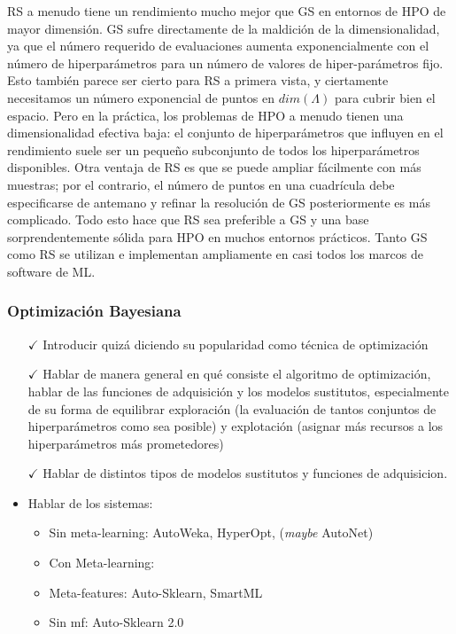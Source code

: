 RS a menudo tiene un rendimiento mucho mejor que GS en entornos de HPO de mayor dimensión. GS sufre directamente de la maldición de la dimensionalidad, ya que el número requerido de evaluaciones aumenta exponencialmente con el número de hiperparámetros para un número de valores de hiper-parámetros fijo. Esto también parece ser cierto para RS a primera vista, y ciertamente necesitamos un número exponencial de puntos en $dim(\varLambda)$ para cubrir bien el espacio. Pero en la práctica, los problemas de HPO a menudo tienen una dimensionalidad efectiva baja: el conjunto de hiperparámetros que influyen en el rendimiento suele ser un pequeño subconjunto de todos los hiperparámetros disponibles. Otra ventaja de RS es que se puede ampliar fácilmente con más muestras; por el contrario, el número de puntos en una cuadrícula debe especificarse de antemano y refinar la resolución de GS posteriormente es más complicado. Todo esto hace que RS sea preferible a GS y una base sorprendentemente sólida para HPO en muchos entornos prácticos. Tanto GS como RS se utilizan e implementan ampliamente en casi todos los marcos de software de ML.

\subsubsection{Optimización Bayesiana}


\begin{itemize}
	\item[$\checkmark$] Introducir quizá diciendo su popularidad como técnica de optimización
	\item[$\checkmark$] Hablar de manera general en qué consiste el algoritmo de optimización, hablar de las funciones de adquisición y los modelos sustitutos, especialmente de su forma de equilibrar exploración (la evaluación de tantos conjuntos de hiperparámetros como sea posible) y explotación (asignar más recursos a los hiperparámetros más prometedores)
	\item[$\checkmark$] Hablar de distintos tipos de modelos sustitutos y funciones de adquisicion.
	\item Hablar de los sistemas: \begin{itemize}
		\item Sin meta-learning: AutoWeka, HyperOpt, (\textit{maybe} AutoNet)
		\item Con Meta-learning: 
		\item Meta-features: Auto-Sklearn, SmartML 
		\item Sin mf: Auto-Sklearn 2.0
	\end{itemize}
\end{itemize}

